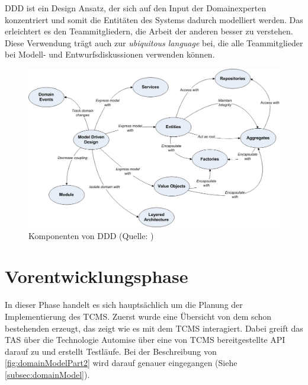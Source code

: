 \documentclass[a4paper, fontsize=11pt, parskip=half, twoside]{scrreprt}
\begin{document}
	\ac{DDD} ist ein Design Ansatz, der sich auf den Input der Domainexperten konzentriert und somit die Entitäten des Systems dadurch modelliert werden.
	Das erleichtert es den Teammitgliedern, die Arbeit der anderen besser zu verstehen.
	Diese Verwendung trägt auch zur \emph{ubiquitous language} bei, die alle Teammitglieder bei Modell- und Entwurfsdiskussionen verwenden können.
	
	\textcite{vernon_implementing_2013}
	
	\begin{figure}[ht]
		\centering
		\includegraphics[scale=0.4]{assets/PatternsDDD.png}
		\caption{Komponenten von \ac{DDD} (Quelle: \textcite{noauthor_domain_nodate})}
	\end{figure}

	
	\section{Vorentwicklungsphase}
	In dieser Phase handelt es sich hauptsächlich um die Planung der Implementierung des \ac{TCMS}.
	Zuerst wurde eine Übersicht von dem schon bestehenden  erzeugt, das zeigt wie es mit dem \ac{TCMS} interagiert.
	Dabei greift das \ac{TAS} über die Technologie Automise über eine von \ac{TCMS} bereitgestellte \ac{API} darauf zu und erstellt Testläufe.
	Bei der Beschreibung von \autoref{fig:domainModelPart2} wird darauf genauer eingegangen (Siehe \autoref{subsec:domainModel}).
	
\end{document}
